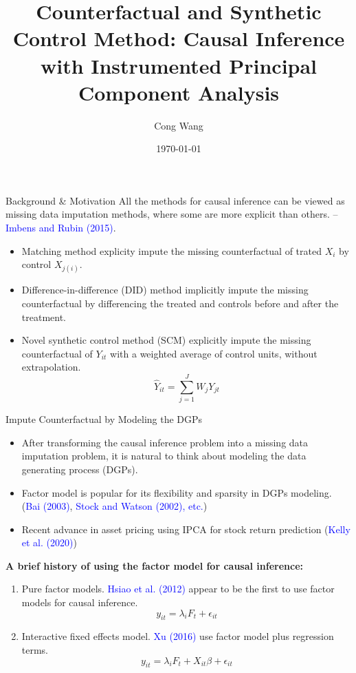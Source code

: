 \documentclass{beamer}
\title{Counterfactual and  Synthetic Control Method: Causal Inference with Instrumented Principal Component Analysis}
\author{Cong Wang}
\institute{Sapienza University of Rome}
\date{\today}
\begin{document}
\begin{frame}
\titlepage
\end{frame}

\begin{frame}{Background \& Motivation}
All the methods for causal inference can be viewed as missing data imputation methods, where some are more explicit than others. -- \textcolor{blue}{Imbens and Rubin (2015)}.

\begin{itemize}
    \item Matching method explicity impute the missing counterfactual of trated $X_i$ by control $X_{j(i)}$.
    \item Difference-in-difference (DID) method implicitly impute the missing counterfactual by differencing the treated and controls before and after the treatment.
    \item Novel synthetic control method (SCM) explicitly impute the missing counterfactual of $Y_{it}$ with a weighted average of control units, without extrapolation.
    $$
    \hat{Y}_{it} = \sum_{j=1}^{J} W_{j} Y_{jt}
    $$
\end{itemize}

\end{frame}

\begin{frame}{Impute Counterfactual by Modeling the DGPs}
\begin{itemize}
    \item After transforming the causal inference problem into a missing data imputation problem, it is natural to think about modeling the data generating process (DGPs).
    \item Factor model is popular for its flexibility and sparsity in DGPs modeling. (\textcolor{blue}{Bai (2003)}, \textcolor{blue}{Stock and Watson (2002), etc.})
    \item Recent advance in asset pricing using IPCA for stock return prediction (\textcolor{blue}{Kelly et al. (2020)})
\end{itemize}

\textbf{A brief history of using the factor model for causal inference:}
\begin{enumerate}
    \item Pure factor models. \textcolor{blue}{Hsiao et al. (2012)} appear to be the first to use factor models for causal inference.
    $$y_{it} = \lambda_i F_t + \epsilon_{it}$$
    \item Interactive fixed effects model. \textcolor{blue}{Xu (2016)} use factor model plus regression terms.
    $$y_{it} = \lambda_{i} F_t + X_{it} \beta + \epsilon_{it}$$
\end{enumerate}
\end{frame}
\end{document}
